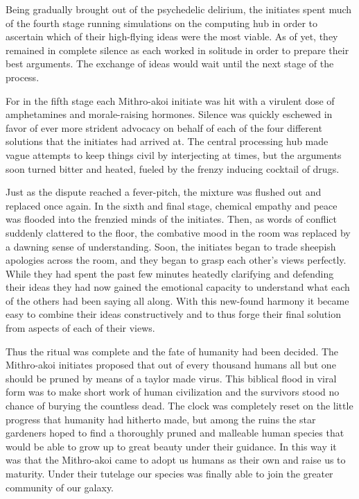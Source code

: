 \documentclass[12pt]{article}
\begin{document}
Being gradually brought out of the psychedelic delirium,
the initiates spent much of the fourth stage running simulations on the computing hub in order to ascertain which of their high-flying ideas were the most viable.
As of yet, they remained in complete silence as each worked in solitude in order to prepare their best arguments.
The exchange of ideas would wait until the next stage of the process.

For in the fifth stage each Mithro-akoi initiate was hit with a virulent dose of amphetamines and morale-raising hormones.
Silence was quickly eschewed in favor of ever more strident advocacy on behalf of each of the four different solutions that the initiates had arrived at.
The central processing hub made vague attempts to keep things civil by interjecting at times,
but the arguments soon turned bitter and heated,
fueled by the frenzy inducing cocktail of drugs.

Just as the dispute reached a fever-pitch,
the mixture was flushed out and replaced once again.
In the sixth and final stage, 
chemical empathy and peace was flooded into the frenzied minds of the initiates.
Then, as words of conflict suddenly clattered to the floor, the combative mood in the room was replaced by a dawning sense of understanding.
Soon, the initiates began to trade sheepish apologies across the room, 
and they began to grasp each other's views perfectly.
While they had spent the past few minutes heatedly clarifying and defending their ideas they had now gained the emotional capacity to understand what each of the others had been saying all along. 
With this new-found harmony it became easy to combine their ideas constructively and to thus forge their final solution from aspects of each of their views.

Thus the ritual was complete and the fate of humanity had been decided.
The Mithro-akoi initiates proposed that out of every thousand humans all but one should be pruned by means of a taylor made virus.
This biblical flood in viral form was to make short work of human civilization 
and the survivors stood no chance of burying the countless dead. 
The clock was completely reset on the little progress that humanity had hitherto made,
but among the ruins the star gardeners hoped to find a thoroughly pruned and malleable human species that would be able to grow up to great beauty under their guidance.
In this way it was that the Mithro-akoi came to adopt us humans as their own and raise us to maturity.
Under their tutelage our species was finally able to join the greater community of our galaxy.
\end{document}
